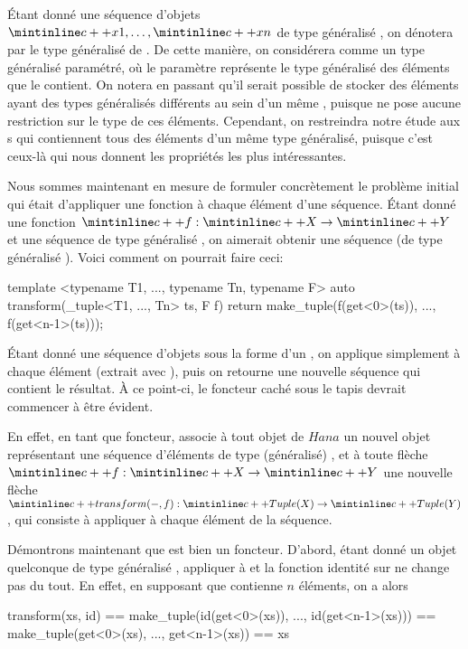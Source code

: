 Étant donné une séquence d'objets $\cc{x1}, \hdots, \cc{xn}$ de type généralisé
, on dénotera par  le type généralisé de .
De cette manière, on considérera  comme un type généralisé paramétré,
où le paramètre représente le type généralisé des éléments que le 
contient. On notera en passant qu'il serait possible de stocker des éléments
ayant des types généralisés différents au sein d'un même , puisque
 ne pose aucune restriction sur le type de ces éléments. Cependant,
on restreindra notre étude aux s qui contiennent tous des éléments
d'un même type généralisé, puisque c'est ceux-là qui nous donnent les propriétés
les plus intéressantes.

Nous sommes maintenant en mesure de formuler concrètement le problème initial
qui était d'appliquer une fonction à chaque élément d'une séquence. Étant
donné une fonction $\cc{f} : \cc{X} \to \cc{Y}$ et une séquence 
de type généralisé , on aimerait obtenir une séquence
 (de type généralisé ).
Voici comment on pourrait faire ceci:
\begin{cpp}
    template <typename T1, ..., typename Tn, typename F>
    auto transform(_tuple<T1, ..., Tn> ts, F f) {
        return make_tuple(f(get<0>(ts)), ..., f(get<n-1>(ts)));
    }
\end{cpp}

Étant donné une séquence d'objets sous la forme d'un , on
applique simplement  à chaque élément (extrait avec ),
puis on retourne une nouvelle séquence qui contient le résultat. À ce
point-ci, le foncteur caché sous le tapis devrait commencer à être évident.

En effet, en tant que foncteur,  associe à tout objet  de $Hana$
un nouvel objet  représentant une séquence d'éléments de type
(généralisé) , et à toute flèche $\cc{f} : \cc{X} \to \cc{Y}$ une
nouvelle flèche $\cc{transform(-, f)} : \cc{Tuple(X)} \to \cc{Tuple(Y)}$,
qui consiste à appliquer  à chaque élément de la séquence.

Démontrons maintenant que  est bien un foncteur. D'abord, étant
donné un objet quelconque  de type généralisé ,
appliquer  à  et la fonction identité sur 
ne change pas  du tout. En effet, en supposant que 
contienne $n$ éléments, on a alors
\begin{cpp}
    transform(xs, id) == make_tuple(id(get<0>(xs)), ..., id(get<n-1>(xs)))
                      == make_tuple(get<0>(xs), ..., get<n-1>(xs))
                      == xs
\end{cpp}

